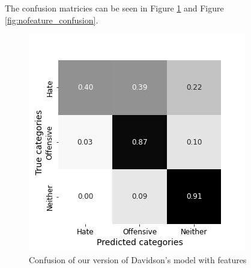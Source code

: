 \documentclass[11pt,a4paper]{article}
\begin{document}
\begin{table}
\caption{classification report for our reproduction of Davidson's model without features} 



\label{tab:davidson_nofeat}
\end{table}

The confusion matricies can be seen in Figure \ref{fig:feature_confusion} and  Figure \ref{fig:nofeature_confusion}.

\begin{figure}[ht]
  \includegraphics[width=\linewidth]{./tables-figures/feat_confusion.jpg}
  \caption{Confusion of our version of Davidson's model with features}
  \label{fig:feature_confusion}
\end{figure}
\end{document}
